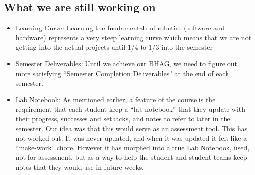 \subsection{What we are still working on}
\begin{itemize}
\item Learning Curve: Learning the fundamentals of robotics (software and hardware) represents a very steep learning curve which means that we are not getting into the actual projects until 1/4 to 1/3 into the semester
\item Semester Deliverables: Until we achieve our BHAG, we need to figure out more satisfying “Semester Completion Deliverables” at the end of each semester.

\item Lab Notebook: As mentioned earlier, a feature of the course is the requirement that each student keep a ``lab notebook'' that they update with their progress, successes and setbacks, and notes to refer to later in the semester. Our idea was that this would serve as an assessment tool. This has not worked out. It was never updated, and when it was updated it felt like a ``make-work'' chore. However it has morphed into a true Lab Notebook, used, not for assessment, but as a way to help the student and student teams keep notes that they would use in future weeks.
\end{itemize}
